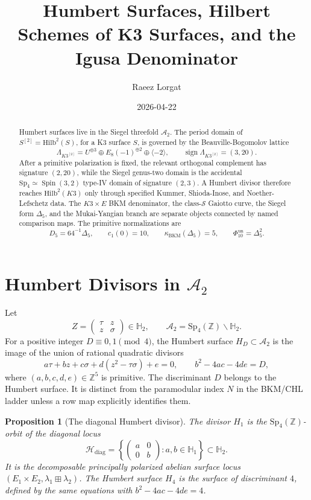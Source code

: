\documentclass[11pt]{article}
\title{Humbert Surfaces, Hilbert Schemes of K3 Surfaces, and the Igusa Denominator}
\author{Raeez Lorgat}
\date{2026-04-22}
\newtheorem{proposition}[theorem]{Proposition}
\providecommand{\Z}{\mathbb{Z}}
\providecommand{\HH}{\mathbb{H}}
\providecommand{\cA}{\mathcal{A}}
\providecommand{\cH}{\mathcal{H}}
\providecommand{\cS}{\mathcal{S}}
\providecommand{\Hilb}{\mathrm{Hilb}}
\providecommand{\Sp}{\mathrm{Sp}}
\providecommand{\kBKM}{\kappa_{\mathrm{BKM}}}
\providecommand{\Dfive}{\Delta_5}
\providecommand{\PhiTen}{\Phi_{10}}
\begin{document}
\maketitle

\begin{abstract}
Humbert surfaces live in the Siegel threefold \(\cA_2\).  The period
domain of \(S^{[2]}=\Hilb^2(S)\), for a K3 surface \(S\), is governed by
the Beauville-Bogomolov lattice
\[
  \Lambda_{K3^{[2]}}
  =
  U^{\oplus 3}\oplus E_8(-1)^{\oplus 2}\oplus\langle -2\rangle,
  \qquad
  \operatorname{sign}\Lambda_{K3^{[2]}}=(3,20).
\]
After a primitive polarization is fixed, the relevant orthogonal
complement has signature \((2,20)\), while the Siegel genus-two domain is
the accidental \(\Sp_4\simeq\operatorname{Spin}(3,2)\) type-IV domain of
signature \((2,3)\).  A Humbert divisor therefore reaches
\(\Hilb^2(K3)\) only through specified Kummer, Shioda-Inose, and
Noether-Lefschetz data.  The \(K3\times E\) BKM denominator, the
class-\(\cS\) Gaiotto curve, the Siegel form \(\Dfive\), and the
Mukai-Yangian branch are separate objects connected by named comparison
maps.  The primitive normalizations are
\[
  D_5=64^{-1}\Dfive,\qquad
  c_1(0)=10,\qquad
  \kBKM(\Dfive)=5,\qquad
  \PhiTen^{\mathrm{un}}=\Dfive^2.
\]
\end{abstract}

\section{Humbert Divisors in \texorpdfstring{\(\cA_2\)}{A2}}

Let
\[
  Z=\begin{pmatrix}\tau&z\\ z&\sigma\end{pmatrix}\in\HH_2,
  \qquad
  \cA_2=\Sp_4(\Z)\backslash\HH_2.
\]
For a positive integer \(D\equiv 0,1\pmod 4\), the Humbert surface
\(H_D\subset\cA_2\) is the image of the union of rational quadratic
divisors
\[
  a\tau+bz+c\sigma+d(z^2-\tau\sigma)+e=0,
  \qquad
  b^2-4ac-4de=D,
\]
where \((a,b,c,d,e)\in\Z^5\) is primitive.  The discriminant \(D\)
belongs to the Humbert surface.  It is distinct from the paramodular
index \(N\) in the BKM/CHL ladder unless a row map explicitly identifies
them.

\begin{proposition}[The diagonal Humbert divisor]
\label{prop:humbert-one}
The divisor \(H_1\) is the \(\Sp_4(\Z)\)-orbit of the diagonal locus
\[
  \cH_{\mathrm{diag}}
  =
  \left\{
    \begin{pmatrix}a&0\\0&b\end{pmatrix}
    : a,b\in\HH_1
  \right\}
  \subset\HH_2.
\]
It is the decomposable principally polarized abelian surface locus
\((E_1\times E_2,\lambda_1\boxplus\lambda_2)\).  The Humbert surface
\(H_4\) is the surface of discriminant \(4\), defined by the same
equations with \(b^2-4ac-4de=4\).
\end{proposition}
\end{document}
